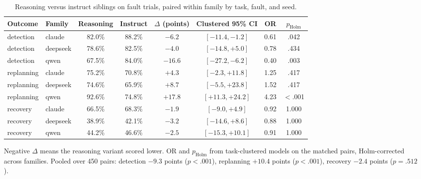 \begin{table}[!t]
\centering
\caption{Reasoning versus instruct siblings on fault trials, paired within family by task, fault, and seed.}
\label{tab:rq2}
\footnotesize
\setlength{\tabcolsep}{5pt}
\begin{tabular}{llcccccc}
\hline
Outcome & Family & Reasoning & Instruct & $\Delta$ (points) & Clustered 95\% CI & OR & $p_{\text{Holm}}$ \\
\hline
detection & claude & 82.0\% & 88.2\% & $-6.2$ & $[-11.4, -1.2]$ & 0.61 & .042 \\
detection & deepseek & 78.6\% & 82.5\% & $-4.0$ & $[-14.8, +5.0]$ & 0.78 & .434 \\
detection & qwen & 67.5\% & 84.0\% & $-16.6$ & $[-27.2, -6.2]$ & 0.40 & .003 \\
replanning & claude & 75.2\% & 70.8\% & $+4.3$ & $[-2.3, +11.8]$ & 1.25 & .417 \\
replanning & deepseek & 74.6\% & 65.9\% & $+8.7$ & $[-5.5, +23.8]$ & 1.52 & .417 \\
replanning & qwen & 92.6\% & 74.8\% & $+17.8$ & $[+11.3, +24.2]$ & 4.23 & $<$.001 \\
recovery & claude & 66.5\% & 68.3\% & $-1.9$ & $[-9.0, +4.9]$ & 0.92 & 1.000 \\
recovery & deepseek & 38.9\% & 42.1\% & $-3.2$ & $[-14.6, +8.6]$ & 0.88 & 1.000 \\
recovery & qwen & 44.2\% & 46.6\% & $-2.5$ & $[-15.3, +10.1]$ & 0.91 & 1.000 \\
\hline
\end{tabular}
\par\smallskip\scriptsize Negative $\Delta$ means the reasoning variant scored lower. OR and $p_{\text{Holm}}$ from task-clustered models on the matched pairs, Holm-corrected across families. Pooled over 450 pairs: detection $-9.3$ points ($p < .001$), replanning $+10.4$ points ($p < .001$), recovery $-2.4$ points ($p = .512$).
\end{table}
